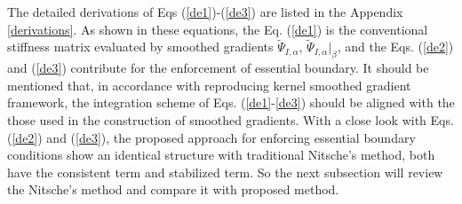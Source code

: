 The detailed derivations of Eqs (\ref{de1})-(\ref{de3}) are listed in the Appendix \ref{derivations}. As shown in these equations, the Eq. (\ref{de1}) is the conventional stiffness matrix evaluated by smoothed gradients $\tilde \Psi_{I,\alpha}$, $\tilde \Psi_{I,\alpha}\vert_\beta$, and the Eqs. (\ref{de2}) and (\ref{de3}) contribute for the enforcement of essential boundary. It should be mentioned that, in accordance with reproducing kernel smoothed gradient framework, the integration scheme of Eqs. (\ref{de1}-\ref{de3}) should be aligned with the those used in the construction of smoothed gradients. With a close look with Eqs. (\ref{de2}) and (\ref{de3}), the proposed approach for enforcing essential boundary conditions show an identical structure with traditional Nitsche's method, both have the consistent term and stabilized term. So the next subsection will review the Nitsche's method and compare it with proposed method.

